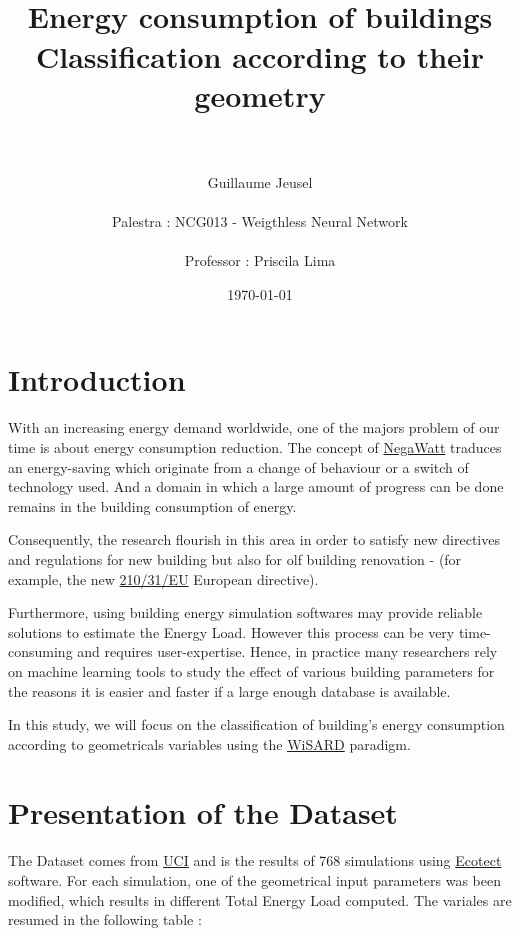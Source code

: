 \documentclass[a4paper, 11pt]{article}
\title{
\normalfont \normalsize
\horrule{0.5pt} \\[0.4cm] %
\huge \textbf{Energy consumption of buildings }\\
Classification according to their geometry\\ %
\horrule{2pt} \\[0.5cm] %
}
\author{Guillaume Jeusel \\ \\
Palestra : NCG013 - Weigthless Neural Network \\ \\
Professor : Priscila Lima}
\date{\normalsize\today} %
\begin{document}
\maketitle %
\newpage
\tableofcontents
\newpage

\section{Introduction}

With an increasing energy demand worldwide, one of the majors problem of
our time is about energy consumption reduction. The concept of
\href{https://en.wikipedia.org/wiki/Negawatt_power}{NegaWatt}
traduces an energy-saving which originate from a change of behaviour
or a switch of technology used. And a domain in which a large amount of
progress can be done remains in the building consumption of energy.

Consequently, the research flourish in this area in order to
satisfy new directives and regulations for new building but also for olf
building renovation - (for example, the new
\href{https://ec.europa.eu/energy/sites/ener/files/documents/2010_mandate_480_en.pdf}
{210/31/EU} European directive).

Furthermore, using building energy simulation softwares may provide reliable solutions
to estimate the Energy Load. However this process can be very time-consuming
and requires user-expertise. Hence, in practice many researchers rely on
machine learning tools to study the effect of various building parameters
for the reasons it is easier and faster if a large enough database is
available.

In this study, we will focus on the classification of building's energy
consumption according to geometricals variables using
the
\href{https://www.elen.ucl.ac.be/Proceedings/esann/esannpdf/es2009-6.pdf}{WiSARD}
paradigm.

\section{Presentation of the Dataset}

The Dataset comes from
\href{https://archive.ics.uci.edu/ml/datasets/Energy+efficiency}{UCI}
and is the results of 768 simulations using
\href{http://logiciels.i3er.org/ecotect.html}{Ecotect} software.
For each simulation, one of the geometrical input parameters was been
modified, which results in different Total Energy Load computed.
The variales are resumed in the following table :\medskip
\end{document}
